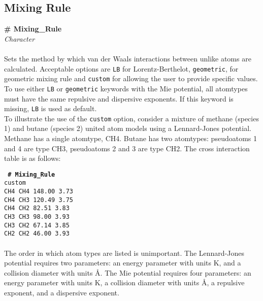 \subsection{Mixing Rule}\label{Mixing_Rule}
{\bf \# Mixing\_Rule} \\
{\it Character} \\ \\
%
Sets the method by which van der Waals interactions between unlike atoms are
calculated. Acceptable options are \texttt{LB}  for Lorentz-Berthelot,
\texttt{geometric}, for geometric mixing rule and \texttt{custom} for allowing the user to provide specific values. 
To use either \texttt{LB} or \texttt{geometric} keywords with the Mie potential, all atomtypes must have the same repulsive and dispersive exponents.
If this keyword is missing, \texttt{LB} is used as default. \\

To illustrate the use of the \texttt{custom} option, consider a mixture of methane (species 1) 
and butane (species 2) united atom models using a Lennard-Jones potential. 
Methane has a single atomtype, CH4. 
Butane has two atomtypes: pseudoatoms 1 and 4 are type CH3, pseudoatoms 2 and 3 are type CH2.
The cross interaction table is as follows:

\texttt{
{\bf \# Mixing\_Rule} \\
custom\\
CH4  CH4  148.00   3.73\\
CH4  CH3  120.49   3.75\\
CH4  CH2   82.51   3.83\\
CH3  CH3   98.00   3.93\\
CH3  CH2   67.14   3.85\\
CH2  CH2   46.00   3.93
}
\\ \\
The order in which atom types are listed is unimportant.
The Lennard-Jones potential requires two parameters: 
an energy parameter with units K, and a collision diameter with units \AA.
The Mie potential requires four parameters: 
an energy parameter with units K, a collision diameter with units \AA,
a repulsive exponent, and a dispersive exponent.

%
%
